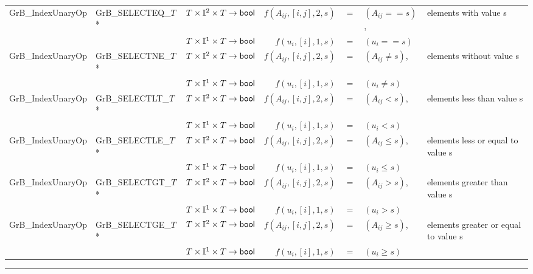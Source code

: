 \begin{landscape}
\begin{table}[h]
\begin{threeparttable}
\begin{tabular}{l|l|l|rcll}
{\sf GrB\_IndexUnaryOp}   & {\sf GrB\_SELECTEQ\_$T$}*  & $T \times \mathbb{I}^2 \times T \rightarrow {\sf bool} $ & $f(A_{ij},[i,j],2,s)$ & $=$ & $(A_{ij} == s)$, & elements with value s \\
                          &                            & $T \times \mathbb{I}^1 \times T \rightarrow {\sf bool} $ & $f(u_{i},[i],1,s)$ & $=$ & $(u_{i} == s)$ \\
{\sf GrB\_IndexUnaryOp}   & {\sf GrB\_SELECTNE\_$T$}*  & $T \times \mathbb{I}^2 \times T \rightarrow {\sf bool} $ & $f(A_{ij},[i,j],2,s)$ & $=$ & $(A_{ij} \neq s)$, & elements without value s \\
                          &                            & $T \times \mathbb{I}^1 \times T \rightarrow {\sf bool} $ & $f(u_{i},[i],1,s)$ & $=$ & $(u_{i} \neq s)$ \\
{\sf GrB\_IndexUnaryOp}   & {\sf GrB\_SELECTLT\_$T$}*  & $T \times \mathbb{I}^2 \times T \rightarrow {\sf bool} $ & $f(A_{ij},[i,j],2,s)$ & $=$ & $(A_{ij} < s)$, & elements less than value s \\
                          &                            & $T \times \mathbb{I}^1 \times T \rightarrow {\sf bool} $ & $f(u_{i},[i],1,s)$ & $=$ & $(u_{i} < s)$ \\
{\sf GrB\_IndexUnaryOp}   & {\sf GrB\_SELECTLE\_$T$}*  & $T \times \mathbb{I}^2 \times T \rightarrow {\sf bool} $ & $f(A_{ij},[i,j],2,s)$ & $=$ & $(A_{ij} \leq s)$, & elements less or equal to value s \\
                          &                            & $T \times \mathbb{I}^1 \times T \rightarrow {\sf bool} $ & $f(u_{i},[i],1,s)$ & $=$ & $(u_{i} \leq s)$ \\
{\sf GrB\_IndexUnaryOp}   & {\sf GrB\_SELECTGT\_$T$}*  & $T \times \mathbb{I}^2 \times T \rightarrow {\sf bool} $ & $f(A_{ij},[i,j],2,s)$ & $=$ & $(A_{ij} > s)$, & elements greater than value s \\
                          &                            & $T \times \mathbb{I}^1 \times T \rightarrow {\sf bool} $ & $f(u_{i},[i],1,s)$ & $=$ & $(u_{i} > s)$ \\
{\sf GrB\_IndexUnaryOp}   & {\sf GrB\_SELECTGE\_$T$}*  & $T \times \mathbb{I}^2 \times T \rightarrow {\sf bool} $ & $f(A_{ij},[i,j],2,s)$ & $=$ & $(A_{ij} \geq s)$, & elements greater or equal to value s \\
                          &                            & $T \times \mathbb{I}^1 \times T \rightarrow {\sf bool} $ & $f(u_{i},[i],1,s)$ & $=$ & $(u_{i} \geq s)$ \\
\end{tabular}
\hrule
\end{threeparttable}
\end{table}

\end{landscape}


